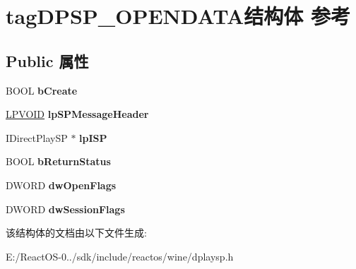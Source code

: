 \hypertarget{structtag_d_p_s_p___o_p_e_n_d_a_t_a}{}\section{tag\+D\+P\+S\+P\+\_\+\+O\+P\+E\+N\+D\+A\+T\+A结构体 参考}
\label{structtag_d_p_s_p___o_p_e_n_d_a_t_a}
\subsection*{Public 属性}
\begin{DoxyCompactItemize}
\item 
\mbox{\label{structtag_d_p_s_p___o_p_e_n_d_a_t_a_ac2df0257ef5e0e13baaa94a910b2bffa}} 
B\+O\+OL {\bfseries b\+Create}
\item 
\mbox{\label{structtag_d_p_s_p___o_p_e_n_d_a_t_a_a2e205d6077329322ddc66277809595a7}} 
\hyperlink{interfacevoid}{L\+P\+V\+O\+ID} {\bfseries lp\+S\+P\+Message\+Header}
\item 
\mbox{\label{structtag_d_p_s_p___o_p_e_n_d_a_t_a_a96f5960b1632605bd997197305e4a45e}} 
I\+Direct\+Play\+SP $\ast$ {\bfseries lp\+I\+SP}
\item 
\mbox{\label{structtag_d_p_s_p___o_p_e_n_d_a_t_a_ae5670d1a73ae65fa98e9062e9834672c}} 
B\+O\+OL {\bfseries b\+Return\+Status}
\item 
\mbox{\label{structtag_d_p_s_p___o_p_e_n_d_a_t_a_a04723b5c826b34d1228ec3525c71eec3}} 
D\+W\+O\+RD {\bfseries dw\+Open\+Flags}
\item 
\mbox{\label{structtag_d_p_s_p___o_p_e_n_d_a_t_a_aa7dc96ec102cbf1dbddfb923b43f7b24}} 
D\+W\+O\+RD {\bfseries dw\+Session\+Flags}
\end{DoxyCompactItemize}


该结构体的文档由以下文件生成\+:\begin{DoxyCompactItemize}
\item 
E\+:/\+React\+O\+S-\/0../sdk/include/reactos/wine/dplaysp.\+h\end{DoxyCompactItemize}

